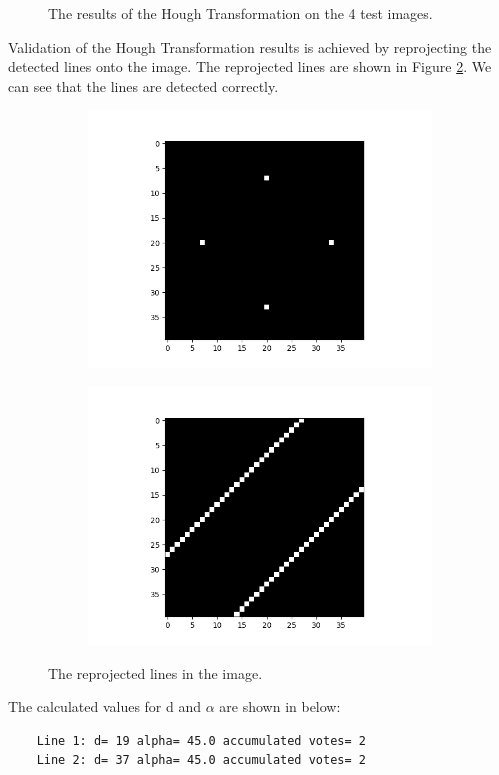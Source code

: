 \documentclass[12pt
,headinclude
,headsepline
,bibtotocnumbered
]{scrartcl}
\begin{document}
\begin{figure}[H]
\begin{subfigure}{0.45\textwidth}
    \end{subfigure}
    \caption{The results of the Hough Transformation on the 4 test images.
    }
    \label{fig:1}
\end{figure}
Validation of the Hough Transformation results is achieved by reprojecting the detected lines onto the image. The reprojected lines are shown in Figure \ref{fig:2}. We can see that the lines are detected correctly.
\begin{figure}[H]
    \centering
    \begin{subfigure}{0.45\textwidth}
        \includegraphics[width=1.25\textwidth]{plots/4points.png}
    \end{subfigure}
    \hfill
    \begin{subfigure}{0.45\textwidth}
        \includegraphics[width=1.25\textwidth]{plots/redraw.png}
    \end{subfigure}
    \caption{The reprojected lines in the image.}
    \label{fig:2}
\end{figure}
The calculated values for d and $\alpha$ are shown in below:
\begin{verbatim}
    Line 1: d= 19 alpha= 45.0 accumulated votes= 2
    Line 2: d= 37 alpha= 45.0 accumulated votes= 2
\end{verbatim}
\end{document}
